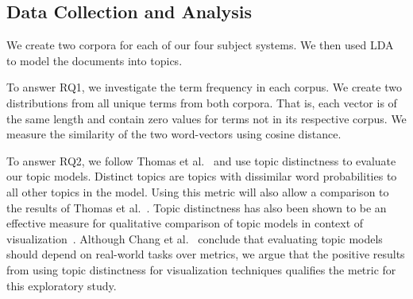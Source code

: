 \subsection{Data Collection and Analysis}

We create two corpora for each of our four subject systems.
We then used LDA to model the documents into topics.

To answer RQ1, we investigate the term frequency in each corpus.
We create two distributions from all unique terms from both corpora.
That is, each vector is of the same length and contain zero values for terms not in its respective corpus.
We measure the similarity of the two word-vectors using cosine distance.

To answer RQ2, we follow Thomas et al.~\cite{Thomas-etal:2011} 
and use topic distinctness to evaluate our topic models.
Distinct topics are topics with dissimilar word probabilities to all other topics in the model.
Using this metric will also allow a comparison to the results of Thomas et al.~\cite{Thomas-etal:2011}. 
Topic distinctness has also been shown to be an effective measure for qualitative
comparison of topic models in context of visualization~\cite{Wei-etal:2010, Chuang-etal:2012}.
Although Chang et al.~\cite{Chang-etal:2009} conclude that evaluating topic models
should depend on real-world tasks over metrics,
we argue that the positive results from using topic distinctness for visualization
techniques qualifies the metric for this exploratory study.


